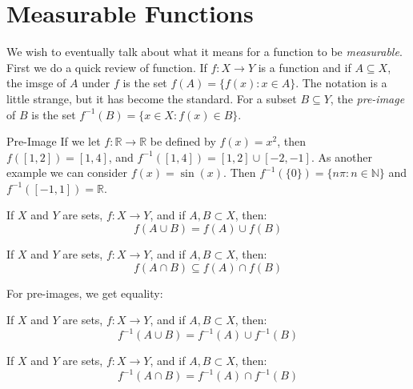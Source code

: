         \section{Measurable Functions}
            We wish to eventually talk about what it means for a
            function to be \textit{measurable}. First we do a quick review
            of function. If $f:X\rightarrow{Y}$ is a function and if
            $A\subseteq{X}$, the imsge of $A$ under $f$ is the set
            $f(A)=\{f(x):x\in{A}\}$. The notation is a little strange, but
            it has become the standard. For a subset $B\subseteq{Y}$, the
            \textit{pre-image} of $B$ is the set
            $f^{-1}(B)=\{x\in{X}:f(x)\in{B}\}$.
            \begin{lexample}{}{Pre-Image}
                If we let $f:\mathbb{R}\rightarrow\mathbb{R}$ be defined
                by $f(x)=x^{2}$, then $f([1,2])=[1,4]$, and
                $f^{-1}([1,4])=[1,2]\cup[-2,-1]$. As another example we
                can consider $f(x)=\sin(x)$. Then
                $f^{-1}(\{0\})=\{n\pi:n\in\mathbb{N}\}$ and
                $f^{-1}([-1,1])=\mathbb{R}$.
            \end{lexample}
            \begin{theorem}
                If $X$ and $Y$ are sets, $f:X\rightarrow{Y}$,
                and if $A,B\subset{X}$, then:
                \begin{equation}
                    f(A\cup{B})=f(A)\cup{f}(B)
                \end{equation}
            \end{theorem}
            \begin{theorem}
                If $X$ and $Y$ are sets, $f:X\rightarrow{Y}$,
                and if $A,B\subset{X}$, then:
                \begin{equation}
                    f(A\cap{B})\subseteq{f(A)\cap{f}(B)}
                \end{equation}
            \end{theorem}
            For pre-images, we get equality:
            \begin{theorem}
                If $X$ and $Y$ are sets, $f:X\rightarrow{Y}$,
                and if $A,B\subset{X}$, then:
                \begin{equation}
                    f^{-1}(A\cup{B})=f^{-1}(A)\cup{f}^{-1}(B)
                \end{equation}
            \end{theorem}
            \begin{theorem}
                If $X$ and $Y$ are sets, $f:X\rightarrow{Y}$,
                and if $A,B\subset{X}$, then:
                \begin{equation}
                    f^{-1}(A\cap{B})=f^{-1}(A)\cap{f}^{-1}(B)
                \end{equation}
            \end{theorem}
